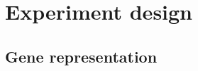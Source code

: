 \documentclass[sigconf]{acmart}
\begin{document}
\maketitle





\section{Experiment design}
\label{sec:experiment}



\subsection{Gene representation}












\end{document}
